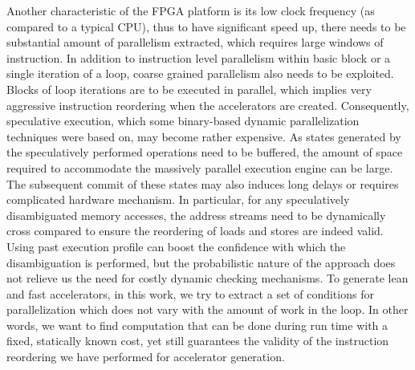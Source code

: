 Another characteristic of the FPGA platform is its low clock frequency
(as compared to a typical CPU), thus to have significant speed up, there
needs to be substantial amount of parallelism extracted, which requires large windows of instruction.
In addition to instruction level parallelism within basic block or a single iteration of a loop, coarse grained parallelism 
also needs to be exploited. Blocks of loop iterations are to be executed in parallel, which implies very aggressive instruction
reordering when the accelerators are created.
%
Consequently, speculative execution, which some binary-based dynamic parallelization techniques were based on, may become rather expensive. As states generated by the speculatively performed operations need to be buffered, 
the amount of space required to accommodate the massively parallel execution engine
can be large.
The subsequent commit of these states may also induces long delays
or requires complicated hardware mechanism.
In particular, for any speculatively disambiguated memory accesses, the address streams need to be dynamically cross compared to ensure the
reordering of loads and stores are indeed valid. 
Using past execution profile can boost the confidence with which the disambiguation
is performed, but the probabilistic nature of the approach does not
relieve us the need for costly dynamic checking mechanisms. To generate
lean and fast accelerators, in this work, we try to extract a set of conditions for parallelization which does not vary with the amount of work
in the loop. In other words, we want to find computation that can 
be done during run time with a fixed, statically known cost, yet still guarantees the validity of the instruction reordering we have performed for accelerator generation. 

